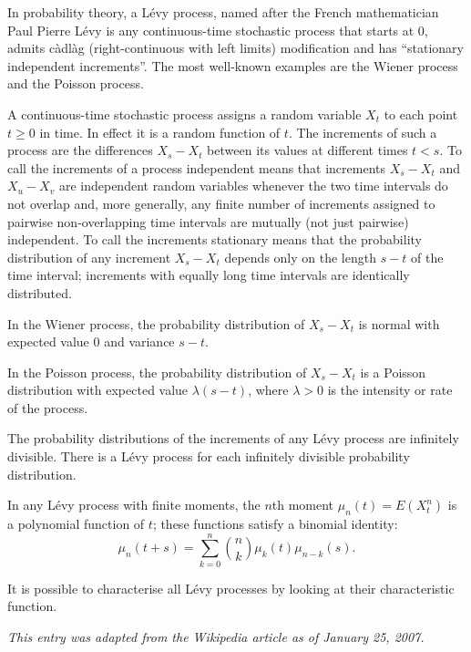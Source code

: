 \documentclass[12pt]{article}
\begin{document}
In probability theory, a L\'evy process, named after the French mathematician Paul Pierre L\'evy is any continuous-time stochastic process that starts at 0, admits c\`adl\`ag (right-continuous with left limits) modification and has ``stationary independent increments''. The most well-known examples are the Wiener process and the Poisson process.

A continuous-time stochastic process assigns a random variable $X_t$ to each point $t \ge 0$ in time. In effect it is a random function of $t$. The increments of such a process are the differences $X_s - X_t$ between its values at different times $t < s$. To call the increments of a process independent means that increments $X_s - X_t$ and $X_u - X_v$ are independent random variables whenever the two time intervals do not overlap and, more generally, any finite number of increments assigned to pairwise non-overlapping time intervals are mutually (not just pairwise) independent. To call the increments stationary means that the probability distribution of any increment $X_s - X_t$ depends only on the length $s  - t$ of the time interval; increments with equally long time intervals are identically distributed.

In the Wiener process, the probability distribution of $X_s - X_t$ is normal with expected value 0 and variance $s - t$.

In the Poisson process, the probability distribution of $X_s - X_t$ is a Poisson distribution with expected value $\lambda(s - t)$, where $\lambda > 0$ is the intensity or rate of the process.

The probability distributions of the increments of any L\'evy process are infinitely divisible. There is a L\'evy process for each infinitely divisible probability distribution.

In any L\'evy process with finite moments, the $n$th moment $\mu_n(t) = E(X_t^n)$ is a polynomial function of $t$; these functions satisfy a binomial identity: $$\mu_n(t + s) = \sum_{k = 0}^n {n \choose k} \mu_k(t) \mu_{n - k}(s).$$

It is possible to characterise all L\'evy processes by looking at their characteristic function.

{\it This entry was adapted from the Wikipedia article  as of January 25, 2007.}
\end{document}
